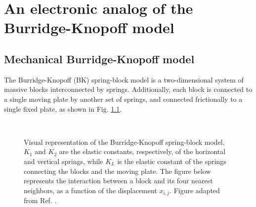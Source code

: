\chapter{An electronic analog of the Burridge-Knopoff model}
\label{chap: electronic analog of bk}

\section{Mechanical Burridge-Knopoff model}
\label{sec: mechanical bk}

The Burridge-Knopoff (BK) spring-block model \cite{bk} is a two-dimensional system of massive blocks
interconnected by springs. Additionally, each block is connected to a single moving plate by another
set of springs, and connected frictionally to a single fixed plate, as shown in Fig. \ref{fig bk}.

\begin{figure}[H]
    \centering
    \\[0.43cm]
    \caption{Visual representation of the Burridge-Knopoff spring-block model. $K_1$ and $K_2$
    are the elastic constants, respectively, of the horizontal and vertical springs, while $K_L$
    is the elastic constant of the springs connecting the blocks and the moving plate.
    The figure below represents the interaction between a block and its four nearest neighbors,
    as a function of the displacement $x_{i,j}$. Figure adapted from Ref. \cite{ofc}.}
    \label{fig bk}
\end{figure}

